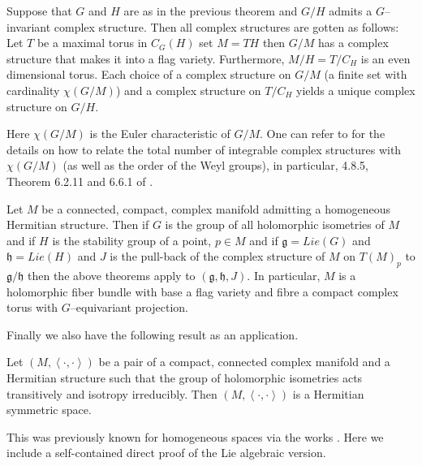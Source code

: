 \documentclass{amse-new}
\numberwithin{equation}{section} %
\begin{document}
\begin{theorem}
\label{description} Suppose that $G$ and $H$ are as in the previous theorem
and $G/H$ admits a $G $--invariant complex structure. Then all complex
structures are gotten as follows: Let $T$ be a maximal torus in $C_{G}(H)$ set
$M=TH$ then $G/M$ has a complex structure that makes it into a flag variety.
Furthermore, $M/H=T/C_{H}$ is an even dimensional torus. Each choice of a
complex structure on $G/M$ (a finite set with cardinality $\chi(G/M)$) and a
complex structure on $T/C_{H}$ yields a unique complex structure on $G/H$.
\end{theorem}
Here $\chi(G/M)$ is the Euler characteristic of $G/M$. One can refer to \cite{BH, Wallach, Wang} for the details on how to relate the total number of integrable complex structures with  $\chi(G/M)$ (as well as the order of the Weyl groups), in particular,  4.8.5, Theorem 6.2.11 and  6.6.1 of \cite{Wallach}.
\begin{theorem}
\label{Herm} Let $M$ be a connected, compact, complex manifold admitting a
homogeneous Hermitian structure. Then if $G$ is the group of all holomorphic
isometries of \thinspace$M$ and if $H$ is the stability group of a point,
$p\in M$ and if $\mathfrak{g}=Lie(G)$ and $\mathfrak{h}=Lie(H) $ and $J$ is
the pull-back of the complex structure of $M$ on $T(M)_{p}$ to $\mathfrak{g}%
/\mathfrak{h}$ then the above theorems apply to $(\mathfrak{g},\mathfrak{h}%
,J)$. In particular, $M$ is a holomorphic fiber bundle with base a flag
variety and fibre a compact complex torus with $G$--equivariant projection.
\end{theorem}

Finally we also have the following result as an application.

\begin{theorem}
\label{Irreducible} Let $(M,\left\langle \cdot, \cdot\right\rangle )$ be a
pair of a compact, connected complex manifold and a Hermitian structure such
that the group of holomorphic isometries acts transitively and isotropy
irreducibly. Then $(M,\left\langle \cdot, \cdot\right\rangle )$ is a Hermitian
symmetric space.
\end{theorem}

This was previously known for homogeneous spaces via the works \cite{Wolf, WZ}. Here we include a
self-contained direct proof of the Lie algebraic version.
\end{document}
